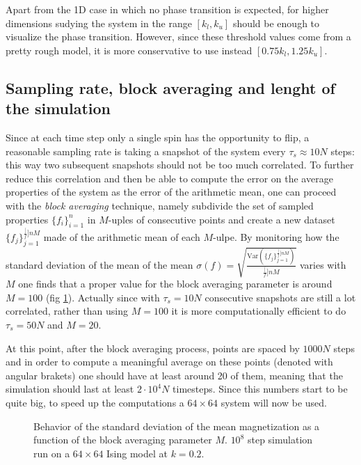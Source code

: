 \documentclass[a4paper, 11pt]{article}
\begin{document}
      Apart from the 1D case in which no phase transition is expected, for higher dimensions sudying the system in the range $[k_l,k_u]$ should be enough to visualize the phase transition. However, since these threshold values come from a pretty rough model, it is more conservative to use instead $[0.75k_l,1.25k_u]$.


    \subsection{Sampling rate, block averaging and lenght of the simulation}
      Since at each time step only a single spin has the opportunity to flip, a reasonable sampling rate is taking a snapshot of the system every $\tau_s \approx 10N$ steps: this way two subsequent snapshots should not be too much correlated. To further reduce this correlation and then be able to compute the error on the average properties of the system as the error of the arithmetic mean, one can proceed with the \emph{block averaging} technique, namely subdivide the set of sampled properties $\{f_i\}_{i=1}^n$ in $M$-uples of consecutive points and create a new dataset $\{f_j\}_{j=1}^{\frac[f]{n}{M}}$ made of the arithmetic mean of each $M$-ulpe.
      By monitoring how the standard deviation of the mean of the mean $\sigma(f) = \sqrt{\frac{\text{Var}\left( \{f_j\}_{j=1}^{\frac[f]{n}{M}} \right)}{\frac[f]{n}{M}}}$ varies with $M$ one finds that a proper value for the block averaging parameter is around $M = 100$ (fig \ref{fig:block_averaging}).
      Actually since with $\tau_s = 10N$ consecutive snapshots are still a lot correlated, rather than using $M = 100$ it is more computationally efficient to do $\tau_s = 50N$ and $M = 20$.


      At this point, after the block averaging process, points are spaced by $1000 N$ steps and in order to compute a meaningful average on these points (denoted with angular brakets) one should have at least around 20 of them, meaning that the simulation should last at least $2\cdot10^4 N$ timesteps.
      Since this numbers start to be quite big, to speed up the computations a $64\times64$ system will now be used.

      \begin{figure}[H]
        \centering
        \caption{Behavior of the standard deviation of the mean magnetization as a function of the block averaging parameter $M$. $10^8$ step simulation run on a $64\times64$ Ising model at $k = 0.2$.}
        \label{fig:block_averaging}
      \end{figure}
\end{document}
